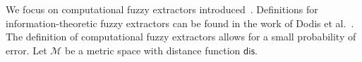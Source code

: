 \documentclass[11pt]{article}
\newcommand{\class}[1]{{\ensuremath{\mathsf{#1}}}}
\newcommand{\gen}{\ensuremath{\class{Gen}}\xspace}
\newcommand{\rep}{\ensuremath{\class{Rep}}\xspace}
\newcommand{\sketch}{\ensuremath{\class{SS}}\xspace}
\newcommand{\rec}{\ensuremath{\class{Rec}}\xspace}
\newcommand{\dis}{\ensuremath{\mathsf{dis}}}
\newtheorem{definition}[theorem]{Definition}
\begin{document}
We focus on computational fuzzy extractors introduced~\cite{fuller2013computational}.  Definitions for information-theoretic fuzzy extractors can be found in the work of Dodis et al.~\cite[Sections 2.5--4.1]{DBLP:journals/siamcomp/DodisORS08}.  The definition of computational fuzzy extractors allows for a small probability of error.  Let $\mathcal{M}$ be a metric space with distance function $\dis$.
%
\end{document}
